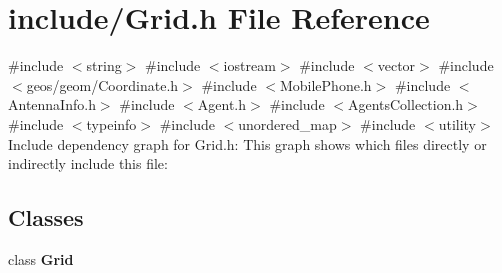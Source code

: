 \section{include/\+Grid.h File Reference}
\label{_grid_8h}
{\ttfamily \#include $<$string$>$}\newline
{\ttfamily \#include $<$iostream$>$}\newline
{\ttfamily \#include $<$vector$>$}\newline
{\ttfamily \#include $<$geos/geom/\+Coordinate.\+h$>$}\newline
{\ttfamily \#include $<$Mobile\+Phone.\+h$>$}\newline
{\ttfamily \#include $<$Antenna\+Info.\+h$>$}\newline
{\ttfamily \#include $<$Agent.\+h$>$}\newline
{\ttfamily \#include $<$Agents\+Collection.\+h$>$}\newline
{\ttfamily \#include $<$typeinfo$>$}\newline
{\ttfamily \#include $<$unordered\+\_\+map$>$}\newline
{\ttfamily \#include $<$utility$>$}\newline
Include dependency graph for Grid.\+h\+:
This graph shows which files directly or indirectly include this file\+:
\subsection*{Classes}
\begin{DoxyCompactItemize}
\item 
class \textbf{ Grid}
\end{DoxyCompactItemize}
